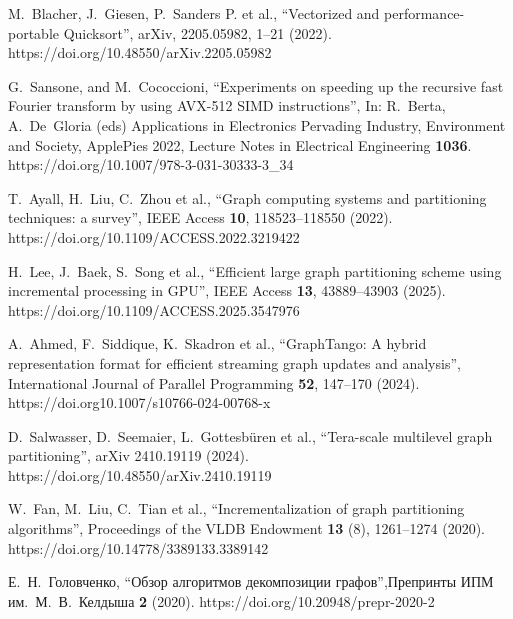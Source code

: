 \documentclass[
11pt,%
tightenlines,%
twoside,%
onecolumn,%
nofloats,%
nobibnotes,%
nofootinbib,%
superscriptaddress,%
noshowpacs,%
centertags]%
{revtex4}
\begin{document}
\begin{thebibliography}{99}
M.~Blacher, J.~Giesen, P.~Sanders P. et al., \textquotedblleft Vectorized and performance-portable Quicksort\textquotedblright, arXiv, 2205.05982, 1--21 (2022). https://doi.org/10.48550/arXiv.2205.05982

G.~Sansone, and M.~Cococcioni, \textquotedblleft Experiments on speeding up the recursive fast Fourier transform by using AVX-512 SIMD instructions\textquotedblright, In: R.~Berta, A.~De~Gloria (eds) Applications in Electronics Pervading Industry, Environment and Society, ApplePies 2022, Lecture Notes in Electrical Engineering \textbf{1036}. https://doi.org/10.1007/978-3-031-30333-3\_34


T.~Ayall, H.~Liu, C.~Zhou et al., \textquotedblleft Graph computing systems and partitioning techniques: a survey\textquotedblright, IEEE Access \textbf{10}, 118523--118550 (2022). https://doi.org/10.1109/ACCESS.2022.3219422

H.~Lee, J.~Baek, S.~Song et al., \textquotedblleft Efficient large graph partitioning scheme using incremental processing in GPU\textquotedblright, IEEE Access \textbf{13}, 43889--43903 (2025). https://doi.org/10.1109/ACCESS.2025.3547976

A.~Ahmed, F.~Siddique, K.~Skadron et al., \textquotedblleft GraphTango: A hybrid representation format for efficient streaming graph updates and analysis\textquotedblright, International Journal of Parallel Programming \textbf{52}, 147--170 (2024). https://doi.org10.1007/s10766-024-00768-x

D.~Salwasser, D.~Seemaier, L.~Gottesb\"uren et al., \textquotedblleft Tera-scale multilevel graph partitioning\textquotedblright, arXiv 2410.19119 (2024). https://doi.org/10.48550/arXiv.2410.19119

W.~Fan, M.~Liu, C.~Tian et al., \textquotedblleft Incrementalization of graph partitioning algorithms\textquotedblright, Proceedings of the VLDB Endowment \textbf{13} (8), 1261--1274 (2020). https://doi.org/10.14778/3389133.3389142

Е.~Н.~Головченко, \textquotedblleft Обзор алгоритмов декомпозиции графов\textquotedblright ,Препринты ИПМ им.~М.~В.~Келдыша \textbf{2} (2020). https://doi.org/10.20948/prepr-2020-2


\end{thebibliography}
\end{document}
